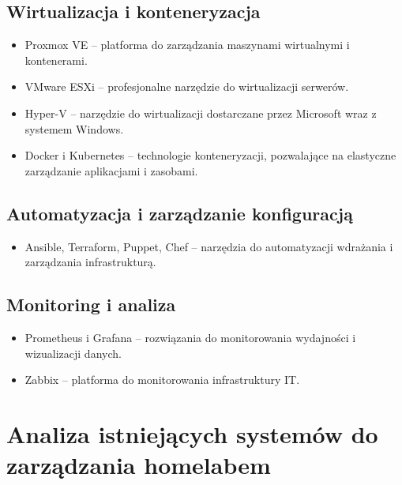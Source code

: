 \subsection{Wirtualizacja i konteneryzacja}
\begin{itemize}
    \item Proxmox VE – platforma do zarządzania maszynami wirtualnymi i kontenerami.
    \item VMware ESXi – profesjonalne narzędzie do wirtualizacji serwerów.
    \item Hyper-V – narzędzie do wirtualizacji dostarczane przez Microsoft wraz z systemem Windows.
    \item Docker i Kubernetes – technologie konteneryzacji, pozwalające na elastyczne zarządzanie aplikacjami i zasobami.
\end{itemize}

\subsection{Automatyzacja i zarządzanie konfiguracją}
\begin{itemize}
    \item Ansible, Terraform, Puppet, Chef – narzędzia do automatyzacji wdrażania i zarządzania infrastrukturą.
\end{itemize}

\subsection{Monitoring i analiza}
\begin{itemize}
    \item Prometheus i Grafana – rozwiązania do monitorowania wydajności i wizualizacji danych.
    \item Zabbix – platforma do monitorowania infrastruktury IT.
\end{itemize}

\section{Analiza istniejących systemów do zarządzania homelabem}
